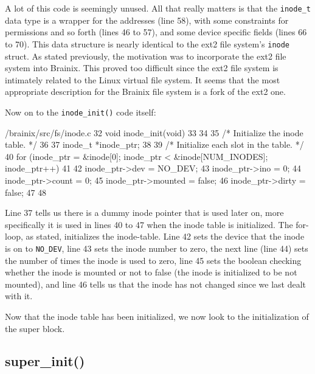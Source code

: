 A lot of this code is seemingly unused. All that really matters is that the \verb|inode_t| data type is a wrapper for the addresses (line 58), with some constraints for permissions and so forth (lines 46 to 57), and some device specific fields (lines 66 to 70). This data structure is nearly identical to the ext2 file system's \verb|inode| struct. As stated previously, the motivation was to incorporate the ext2 file system into Brainix. This proved too difficult since the ext2 file system is intimately related to the Linux virtual file system. It seems that the most appropriate description for the Brainix file system is a fork of the ext2 one. 

Now on to the \verb|inode_init()| code itself:
\begin{code}{/brainix/src/fs/inode.c}
32 void inode_init(void)
33 {
34 
35 /* Initialize the inode table. */
36
37      inode_t *inode_ptr;
38
39      /* Initialize each slot in the table. */
40      for (inode_ptr = &inode[0]; inode_ptr < &inode[NUM_INODES]; inode_ptr++)
41      {
42           inode_ptr->dev = NO_DEV;
43           inode_ptr->ino = 0;
44           inode_ptr->count = 0;
45           inode_ptr->mounted = false;
46           inode_ptr->dirty = false;
47      }
48 }
\end{code}
Line 37 tells us there is a dummy inode pointer that is used later on, more specifically it is used in lines 40 to 47 when the inode table is initialized. The for-loop, as stated, initializes the inode-table. Line 42 sets the device that the inode is on to \verb|NO_DEV|, line 43 sets the inode number to zero, the next line (line 44) sets the number of times the inode is used to zero, line 45 sets the boolean checking whether the inode is mounted or not to false (the inode is initialized to be not mounted), and line 46 tells us that the inode has not changed since we last dealt with it.

Now that the inode table has been initialized, we now look to the initialization of the super block.

\subsection{super\_init()}

